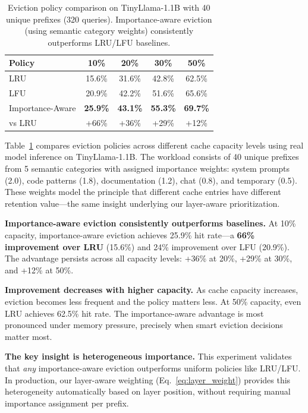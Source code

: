 \documentclass[10pt,conference]{IEEEtran}
\begin{document}
\begin{table}[t]
\centering
\caption{Eviction policy comparison on TinyLlama-1.1B with 40 unique prefixes (320 queries). Importance-aware eviction (using semantic category weights) consistently outperforms LRU/LFU baselines.}
\label{tab:eviction}
\begin{tabular}{lcccc}
\toprule
Policy & 10\% & 20\% & 30\% & 50\% \\
\midrule
LRU & 15.6\% & 31.6\% & 42.8\% & 62.5\% \\
LFU & 20.9\% & 42.2\% & 51.6\% & 65.6\% \\
Importance-Aware & \textbf{25.9\%} & \textbf{43.1\%} & \textbf{55.3\%} & \textbf{69.7\%} \\
\midrule
vs LRU & +66\% & +36\% & +29\% & +12\% \\
\bottomrule
\end{tabular}
\end{table}

Table~\ref{tab:eviction} compares eviction policies across different cache capacity levels using real model inference on TinyLlama-1.1B. The workload consists of 40 unique prefixes from 5 semantic categories with assigned importance weights: system prompts (2.0), code patterns (1.8), documentation (1.2), chat (0.8), and temporary (0.5). These weights model the principle that different cache entries have different retention value---the same insight underlying our layer-aware prioritization.

\textbf{Importance-aware eviction consistently outperforms baselines.} At 10\% capacity, importance-aware eviction achieves 25.9\% hit rate---a \textbf{66\% improvement over LRU} (15.6\%) and 24\% improvement over LFU (20.9\%). The advantage persists across all capacity levels: +36\% at 20\%, +29\% at 30\%, and +12\% at 50\%.

\textbf{Improvement decreases with higher capacity.} As cache capacity increases, eviction becomes less frequent and the policy matters less. At 50\% capacity, even LRU achieves 62.5\% hit rate. The importance-aware advantage is most pronounced under memory pressure, precisely when smart eviction decisions matter most.

\textbf{The key insight is heterogeneous importance.} This experiment validates that \emph{any} importance-aware eviction outperforms uniform policies like LRU/LFU. In production, our layer-aware weighting (Eq.~\ref{eq:layer_weight}) provides this heterogeneity automatically based on layer position, without requiring manual importance assignment per prefix.
\end{document}
